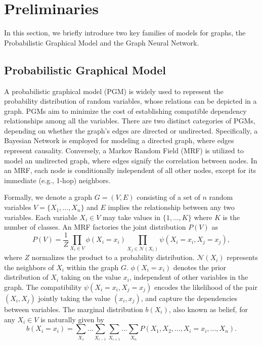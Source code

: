 \section{Preliminaries}
\label{sec:preliminaries}
In this section, we briefly introduce two key families of models for graphs, the Probabilistic Graphical Model and the Graph Neural Network.

\subsection{Probabilistic Graphical Model}
A probabilistic graphical model (PGM) \cite{bishop2006pattern,jordan2004graphical} is widely used to represent the probability distribution of random variables, whose relations can be depicted in a graph.
PGMs aim to minimize the cost of establishing compatible dependency relationships among all the variables. 
There are two distinct categories of PGMs, depending on whether the graph's edges are directed or undirected. 
Specifically, a Bayesian Network is employed for modeling a directed graph, where edges represent causality. 
Conversely, a Markov Random Field (MRF) is utilized to model an undirected graph, where edges signify the correlation between nodes. 
In an MRF, each node is conditionally independent of all other nodes, except for its immediate (e.g., 1-hop) neighbors.

Formally, 
we denote a graph $G=(V,E)$ consisting of a set of $n$ random variables $V=\{ X_1, \dots, X_n \}$ and $E$ implies the relationship between any two variables. 
Each variable $X_i \in V$ may take values in $\{1,\dots, K\}$ where $K$ is the number of classes.
An MRF factories the joint distribution $P(V)$ as 
\begin{equation}
\label{eq:pgm_joint}
    P(V)=\frac{1}{Z}\prod_{X_i\in V} \phi(X_i=x_i) \prod_{X_j\in \mathcal{N}(X_i)}\psi(X_i=x_i, X_j=x_j),
\end{equation}
where $Z$ normalizes the product to a probability distribution.
$\mathcal{N}(X_i)$ represents the neighbors of $X_i$ within the graph $G$.
$\phi(X_i=x_i)$ denotes the prior distribution of $X_i$ taking on the value $x_i$, independent of other variables in the graph.
The compatibility $\psi(X_i=x_i, X_j=x_j)$ encodes the likelihood of the pair
$(X_i, X_j)$ jointly taking the value $(x_i, x_j)$,
and capture the dependencies between variables.
The marginal distribution $b(X_i)$, also known as belief, for any $X_i \in V$ is naturally given by
\begin{equation}
\label{eq:pgm_margin}
    b(X_i=x_i) = \sum_{X_1} \dots \sum_{X_{i-1}} \sum_{X_{i+1}} \dots \sum_{X_n} P(X_1, X_2, \dots, X_i=x_i, \dots, X_n).
\end{equation}


